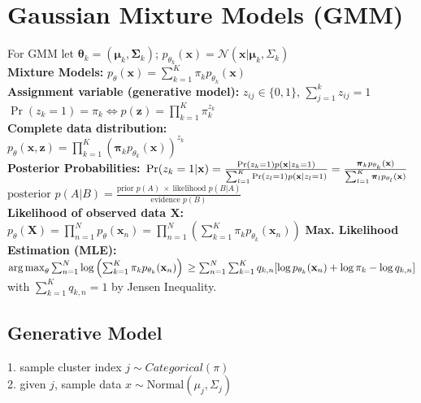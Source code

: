 \section{Gaussian Mixture Models (GMM)}
For GMM let $\boldsymbol{\theta}_k = (\boldsymbol{\mu}_k, \boldsymbol{\Sigma}_k)$; $p_{\theta_k}(\mathbf{x}) = \mathcal{N}(\mathbf{x} | \boldsymbol{\mu}_k, \Sigma_k)$\\
\textbf{Mixture Models:} $p_\theta(\mathbf{x}) = \sum_{k=1}^K \pi_k p_{\theta_k}(\mathbf{x})$\\
\textbf{Assignment variable (generative model):} $z_{ij} \in \{0, 1\}$, $\sum_{j=1}^k z_{ij} = 1$\\
$\operatorname{Pr}(z_k = 1) = \pi_k \Leftrightarrow p(\mathbf{z}) = \prod_{k=1}^K \pi_k^{z_k}$\\
\textbf{Complete data distribution:}\\
$p_\theta(\mathbf{x}, \mathbf{z}) = \prod_{k=1}^K \left( \boldsymbol{\pi}_k p_{\theta_k}(\mathbf{x})\right)^{z_k}$\\
\textbf{Posterior Probabilities:} $\\\operatorname{Pr}(z_k = 1 | \mathbf{x}) = \frac{\operatorname{Pr}(z_k = 1) p(\mathbf{x} | z_k = 1)}{\sum_{l=1}^K \operatorname{Pr}(z_l = 1) p(\mathbf{x} | z_l = 1)} = \frac{\boldsymbol{\pi}_k p_{\theta_k}(\mathbf{x})}{\sum_{l=1}^K \boldsymbol{\pi}_l p_{\theta_l}(\mathbf{x})}$
$\text{posterior } p(A|B)=\frac{\text{prior } p(A)\ \times \ \text{likelihood } p(B|A)}{\text{evidence } p(B)}$\\
\textbf{Likelihood of observed data $\mathbf{X}$:}\\
$p_\theta(\mathbf{X}) = \prod_{n=1}^N p_\theta(\mathbf{x}_n) = \prod_{n=1}^N \left(\sum_{k=1}^K \pi_k p_{\theta_k}(\mathbf{x}_n)\right)$
\textbf{Max. Likelihood Estimation (MLE):}\\
$\operatorname*{arg\,max}_\theta\sum_{n=1}^N \log \left( \sum_{k=1}^K \pi_k p_{\theta_k}(\mathbf{x}_n)\right)\\
\ge \sum_{n=1}^N \sum_{k=1}^K{q_{k,n}[\log p_{\theta_k}(\mathbf{x}_n) + \log \pi_k - \log q_{k,n}]}$\\
with $\sum_{k=1}^K{q_{k,n}} = 1$ by Jensen Inequality.

\subsection*{Generative Model}
1. sample cluster index $j \sim Categorical(\pi)$\\
2. given $j$, sample data $x \sim \text{Normal}(\mu_j, \Sigma_j)$


